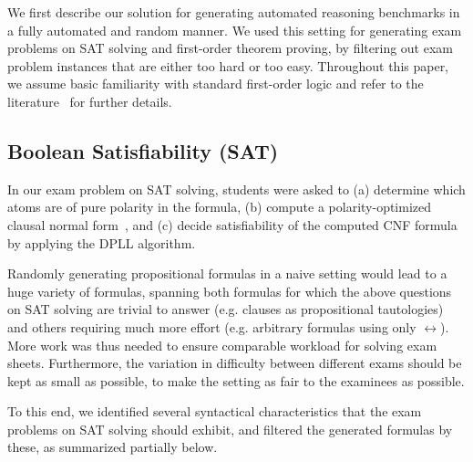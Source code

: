 We first describe our solution for generating automated reasoning
benchmarks in a fully automated and random manner. We used this
setting for generating exam problems on SAT solving and first-order
theorem proving, by 
filtering out exam problem instances that are either too
hard or too easy. Throughout this paper, we assume basic familiarity with standard first-order
logic and refer to the literature~\cite{SAT09,Vampire13} for further details.


\subsection{Boolean Satisfiability (SAT)}\label{sec:sat}

In our exam problem on SAT solving, students were asked to
(a) determine which atoms are of pure polarity in the formula,
(b) compute a polarity-optimized clausal normal form~\cite{Tseytin70},
and (c) decide satisfiability of the computed CNF formula by applying the DPLL algorithm.

Randomly generating propositional formulas in a naive setting would lead
to a huge variety of formulas,
spanning both formulas for which the above questions on SAT solving
are trivial to answer (e.g. clauses as propositional tautologies)
and others requiring much more effort
(e.g. arbitrary formulas using only $\leftrightarrow$).
More work was thus needed to
ensure comparable workload for solving exam sheets.
Furthermore,
the variation in difficulty between different exams should be kept as small as possible,
to make the setting as fair to the examinees as possible.

To this end,
we identified several  syntactical characteristics that the exam problems on SAT solving should exhibit,
and filtered the generated formulas by these, as summarized  partially
below. \smallskip
%

